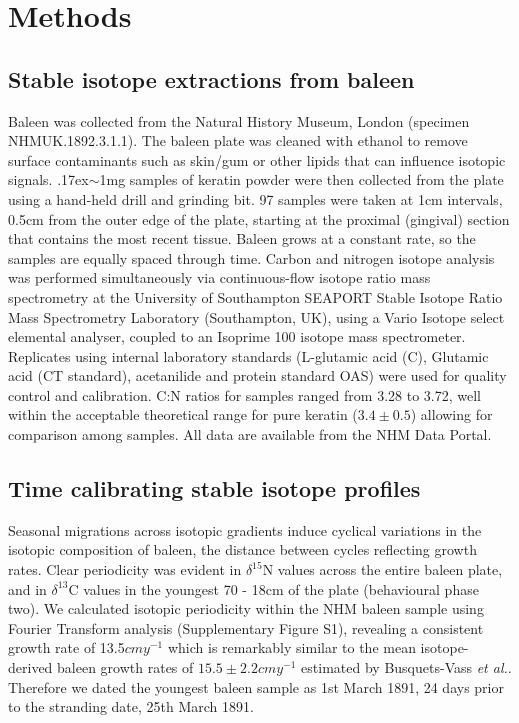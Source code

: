 \documentclass[a4paper,12pt]{article}
\begin{document}
\section{Methods}\label{methods}

\subsection{Stable isotope extractions from baleen}\label{stable-isotope-extractions-from-baleen}

Baleen was collected from the Natural History Museum, London (specimen NHMUK.1892.3.1.1). 
The baleen plate was cleaned with ethanol to remove surface contaminants such as skin/gum or other lipids that can influence isotopic signals. 
{\raise.17ex\hbox{$\scriptstyle\sim$}}1mg samples of keratin powder were then collected from the plate using a hand-held drill and grinding bit. 
97 samples were taken at 1cm intervals, 0.5cm from the outer edge of the plate, starting at the proximal (gingival) section that contains the most recent tissue. 
Baleen grows at a constant rate, so the samples are equally spaced through time\cite{best1996stable}. 
Carbon and nitrogen isotope analysis was performed simultaneously via continuous-flow isotope ratio mass spectrometry at the University of Southampton SEAPORT Stable Isotope Ratio Mass Spectrometry Laboratory (Southampton, UK), using a Vario Isotope select elemental analyser, coupled to an Isoprime 100 isotope mass spectrometer. 
Replicates using internal laboratory standards (L-glutamic acid (C), Glutamic acid (CT standard), acetanilide and protein standard OAS) were used for quality control and calibration. 
C:N ratios for samples ranged from 3.28\text{\textperthousand} to 3.72\text{\textperthousand}, well within the acceptable theoretical range for pure keratin ($3.4\pm0.5$) allowing for comparison among samples\cite{hobson1998stable}. 
All data are available from the NHM Data Portal\cite{data-set}.

\subsection{Time calibrating stable isotope
profiles}\label{time-calibrating-stable-isotope-profiles}

Seasonal migrations across isotopic gradients induce cyclical variations in the isotopic composition of baleen, the distance between cycles reflecting growth rates\cite{hobson1998stable,busquets2017estimating}. 
Clear periodicity was evident in $\delta^{15}$N values across the entire baleen plate, and in $\delta^{13}$C values in the youngest 70 - 18cm of the plate (behavioural phase two). 
We calculated isotopic periodicity within the NHM baleen sample using Fourier Transform analysis\cite{cardona2017temporal} (Supplementary Figure S1), revealing a consistent growth rate of 13.5$cmy^{-1}$ which is remarkably similar to the mean isotope-derived baleen growth rates of $15.5 \pm 2.2cmy^{-1}$ estimated by Busquets-Vass \textit{et al.}\cite{busquets2017estimating}.  
Therefore we dated the youngest baleen sample as 1st March 1891, 24 days prior to the stranding date, 25th March 1891. 
\end{document}

